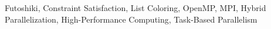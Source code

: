 \documentclass[10pt, conference]{IEEEtran}
\begin{document}
\begin{IEEEkeywords}
Futoshiki, Constraint Satisfaction, List Coloring, OpenMP, MPI, Hybrid Parallelization, High-Performance Computing, Task-Based Parallelism
\end{IEEEkeywords}










\end{document}
